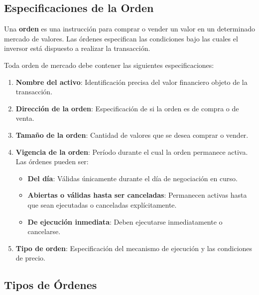 \subsection{Especificaciones de la Orden}

\begin{definicion}
Una \textbf{orden} es una instrucción para comprar o vender un valor en un determinado mercado de valores. Las órdenes especifican las condiciones bajo las cuales el inversor está dispuesto a realizar la transacción.
\end{definicion}

\begin{teorema}
Toda orden de mercado debe contener las siguientes especificaciones:

\begin{enumerate}
\item \textbf{Nombre del activo}: Identificación precisa del valor financiero objeto de la transacción.

\item \textbf{Dirección de la orden}: Especificación de si la orden es de compra o de venta.

\item \textbf{Tamaño de la orden}: Cantidad de valores que se desea comprar o vender.

\item \textbf{Vigencia de la orden}: Período durante el cual la orden permanece activa. Las órdenes pueden ser:
\begin{itemize}
\item \textbf{Del día}: Válidas únicamente durante el día de negociación en curso.
\item \textbf{Abiertas o válidas hasta ser canceladas}: Permanecen activas hasta que sean ejecutadas o canceladas explícitamente.
\item \textbf{De ejecución inmediata}: Deben ejecutarse inmediatamente o cancelarse.
\end{itemize}

\item \textbf{Tipo de orden}: Especificación del mecanismo de ejecución y las condiciones de precio.
\end{enumerate}
\end{teorema}

\subsection{Tipos de Órdenes}

